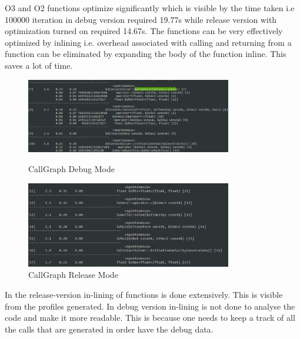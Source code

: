 \documentclass[a4paper,11pt]{article}
\begin{document}
O3 and O2 functions optimize significantly which is visible by the time taken i.e 100000 iteration in debug version required 19.77s while release version with optimization turned on required 14.67s.
The functions can be very effectively optimized by inlining i.e. overhead associated with calling and returning from a function can be eliminated by expanding the body of the function inline. This saves a lot of time.\\
\begin{figure}[ht]
	\begin{minipage}[ht]{0.5\linewidth}
	\includegraphics[width=90mm]{1.eps}
	\caption{CallGraph Debug Mode}	
	\end{minipage}	
	\begin{minipage}[ht]{0.5\linewidth}
	\includegraphics[width=90mm]{2.eps}
	\caption{CallGraph Release Mode}		
	\end{minipage}	
	\end{figure}

In the release-version in-lining of functions is done extensively. This is visible from the profiles generated. In debug version in-lining is not done to analyse the code and make it more readable. This is because one needs to keep a track of all the calls that are generated in order have the debug data.\\
\end{document}
